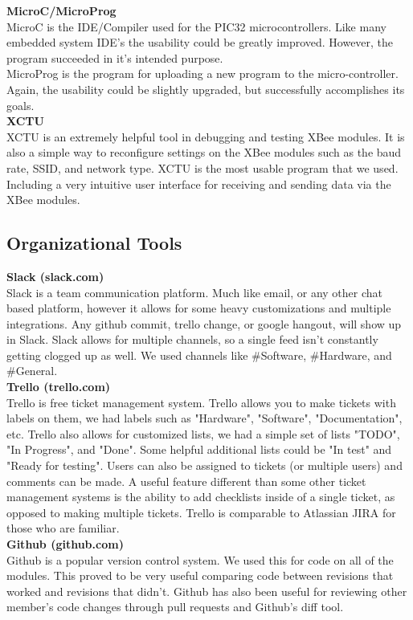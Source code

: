 \documentclass[paper=a4, fontsize=11pt]{scrartcl}
\numberwithin{equation}{section}		%
\numberwithin{figure}{section}			%
\numberwithin{table}{section}				%
\begin{document}
\textbf{MicroC/MicroProg}\\
MicroC is the IDE/Compiler used for the PIC32 microcontrollers. Like many embedded system IDE's the usability could be greatly improved. However, the program succeeded in it's intended purpose.\\
MicroProg is the program for uploading a new program to the micro-controller. Again, the usability could be slightly upgraded, but successfully accomplishes its goals.\\

\textbf{XCTU}\\
XCTU is an extremely helpful tool in debugging and testing XBee modules. It is also a simple way to reconfigure settings on the XBee modules such as the baud rate, SSID, and network type. XCTU is the most usable program that we used. Including a very intuitive user interface for receiving and sending data via the XBee modules.\\

\subsection{Organizational Tools}
\textbf{Slack (slack.com)}\\
Slack is a team communication platform. Much like email, or any other chat based platform, however it allows for some heavy customizations and multiple integrations. Any github commit, trello change, or google hangout, will show up in Slack. Slack allows for multiple channels, so a single feed isn't constantly getting clogged up as well. We used channels like \#Software, \#Hardware, and \#General.\\

\textbf{Trello (trello.com)}\\
Trello is free ticket management system. Trello allows you to make tickets with labels on them, we had labels such as "Hardware", "Software", "Documentation", etc. Trello also allows for customized lists, we had a simple set of lists "TODO", "In Progress", and "Done". Some helpful additional lists could be "In test" and "Ready for testing".  Users can also be assigned to tickets (or multiple users) and comments can be made. A useful feature different than some other ticket management systems is the ability to add checklists inside of a single ticket, as opposed to making multiple tickets. Trello is comparable to Atlassian JIRA for those who are familiar.\\

\textbf{Github (github.com)}\\
Github is a popular version control system. We used this for code on all of the modules. This proved to be very useful comparing code between revisions that worked and revisions that didn't. Github has also been useful for reviewing other member's code changes through pull requests and Github's diff tool.\\
\end{document}
